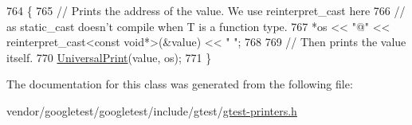 \begin{DoxyCode}
764                                                     \{
765     \textcolor{comment}{// Prints the address of the value.  We use reinterpret\_cast here}
766     \textcolor{comment}{// as static\_cast doesn't compile when T is a function type.}
767     *os << \textcolor{stringliteral}{"@"} << \textcolor{keyword}{reinterpret\_cast<}\textcolor{keyword}{const }\textcolor{keywordtype}{void}*\textcolor{keyword}{>}(&value) << \textcolor{stringliteral}{" "};
768 
769     \textcolor{comment}{// Then prints the value itself.}
770     \hyperlink{namespacetesting_1_1internal_ad121a890bddf866e59605d1a0198dada}{UniversalPrint}(value, os);
771   \}
\end{DoxyCode}


The documentation for this class was generated from the following file\+:\begin{DoxyCompactItemize}
\item 
vendor/googletest/googletest/include/gtest/\hyperlink{gtest-printers_8h}{gtest-\/printers.\+h}\end{DoxyCompactItemize}
